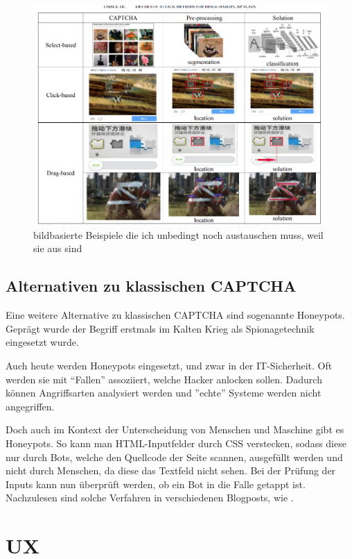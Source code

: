 \begin{figure}
    \centering
    \includegraphics{gfx/mygraphics/unbedingtaustauschen2.png}
    \caption{bildbasierte Beispiele die ich unbedingt noch austauschen muss, weil sie aus \cite{surveyofresearch} sind}
    \label{fig:pr0grammcaptcha}
\end{figure}

\subsection{Alternativen zu klassischen CAPTCHA}
Eine weitere Alternative zu klassischen CAPTCHA sind sogenannte Honeypots. 
Geprägt wurde der Begriff erstmals im Kalten Krieg als Spionagetechnik eingesetzt wurde. \cite[p.2]{joshi:2011} 

Auch heute werden Honeypots eingesetzt, und zwar in der IT-Sicherheit. 
Oft werden sie mit ``Fallen'' assoziiert, welche Hacker anlocken sollen. 
Dadurch können Angriffsarten analysiert werden und ''echte'' Systeme werden nicht angegriffen.

Doch auch im Kontext der Unterscheidung von Menschen und Maschine gibt es Honeypots. 
So kann man HTML-Inputfelder durch CSS verstecken, sodass diese nur durch Bots, welche den Quellcode der Seite scannen, ausgefüllt werden 
und nicht durch Menschen, da diese das Textfeld nicht sehen. 
Bei der Prüfung der Inputs kann nun überprüft werden, ob ein Bot in die Falle getappt ist. 
Nachzulesen sind solche Verfahren in verschiedenen Blogposts, wie \cite{perry:2019}.


\section{UX}

